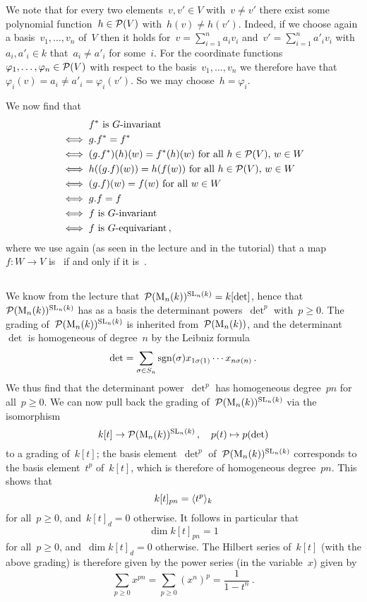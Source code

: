 We note that for every two elements~$v, v' \in V$ with~$v \neq v'$ there exist some polynomial function~$h \in \mathcal{P}(V)$ with~$h(v) \neq h(v')$.
Indeed, if we choose again a basis~$v_1, \dotsc, v_n$ of~$V$ then it holds for~$v = \sum_{i=1}^n a_i v_i$ and~$v' = \sum_{i=1}^n a'_i v_i$ with~$a_i, a'_i \in k$ that~$a_i \neq a'_i$ for some~$i$.
For the coordinate functions~$\varphi_1, \dotsc, \varphi_n \in \mathcal{P}(V)$ with respect to the basis~$v_1, \dotsc, v_n$ we therefore have that~$\varphi_i(v) = a_i \neq a'_i = \varphi_i(v')$.
So we may choose~$h = \varphi_i$.

We now find that
\begin{align*}
      {}& \text{$f^*$ is~\dash{$G$}{invariant}} \\
  \iff{}& g.f^* = f^* \\
  \iff{}& \text{$(g.f^*)(h)(w) = f^*(h)(w)$ for all~$h \in \Pol(V)$,~$w \in W$} \\
  \iff{}& \text{$h((g.f)(w)) = h(f(w))$ for all~$h \in \Pol(V)$,~$w \in W$}  \\
  \iff{}& \text{$(g.f)(w) = f(w)$ for all~$w \in W$}  \\
  \iff{}& g.f = f \\
  \iff{}& \text{$f$ is~\dash{$G$}{invariant}} \\
  \iff{}& \text{$f$ is~\dash{$G$}{equivariant}} \,,
\end{align*}
where we use again (as seen in the lecture and in the tutorial) that a map~$f \colon W \to V$ is~ if and only if it is~.





\subsection{}

We know from the lecture that~$\mathcal{P}(\operatorname{M}_{n}(k))^{\operatorname{SL}_n(k)} = k[\det]$, hence that~$\mathcal{P}(\operatorname{M}_{n}(k))^{\operatorname{SL}_n(k)}$ has as a basis the determinant powers~$\det^p$ with~$p \geq 0$.
The grading of~$\mathcal{P}(\operatorname{M}_{n}(k))^{\operatorname{SL}_n(k)}$ is inherited from~$\mathcal{P}(\operatorname{M}_{n}(k))$, and the determinant~$\det$ is homogeneous of degree~$n$ by the Leibniz formula
\[
    \det
  = \sum_{\sigma \in S_n} \operatorname{sgn}(\sigma) x_{1\sigma(1)} \dotsm x_{n\sigma(n)} \,.
\]
We thus find that the determinant power~$\det^p$ has homogeneous degree~$pn$ for all~$p \geq 0$.
We can now pull back the grading of~$\mathcal{P}(\operatorname{M}_{n}(k))^{\operatorname{SL}_n(k)}$ via the isomorphism
\[
          k[t]
  \to     \mathcal{P}(\operatorname{M}_{n}(k))^{\operatorname{SL}_n(k)} \,,
  \quad   p(t)
  \mapsto p(\det)
\]
to a grading of~$k[t]$;
the basis element~$\det^p$ of~$\mathcal{P}(\operatorname{M}_{n}(k))^{\operatorname{SL}_n(k)}$ corresponds to the basis element~$t^p$ of~$k[t]$, which is therefore of homogeneous degree~$pn$.
This shows that
\[
    k[t]_{pn}
  = \langle t^p \rangle_k
\]
for all~$p \geq 0$, and~$k[t]_d = 0$ otherwise.
It follows in particular that
\[
    \dim k[t]_{pn}
  = 1
\]
for all~$p \geq 0$, and~$\dim k[t]_d = 0$ otherwise.
The Hilbert series of~$k[t]$ (with the above grading) is therefore given by the power series (in the variable~$x$) given by
\[
    \sum_{p \geq 0} x^{pn}
  = \sum_{p \geq 0} (x^n)^p
  = \frac{1}{1-t^n} \,.
\]
